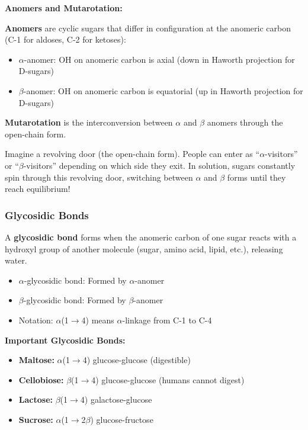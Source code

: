\textbf{Anomers and Mutarotation:}
\begin{definition}
\textbf{Anomers} are cyclic sugars that differ in configuration at the anomeric carbon (C-1 for aldoses, C-2 for ketoses):
\begin{itemize}
    \item $\alpha$-anomer: OH on anomeric carbon is axial (down in Haworth projection for D-sugars)
    \item $\beta$-anomer: OH on anomeric carbon is equatorial (up in Haworth projection for D-sugars)
\end{itemize}

\textbf{Mutarotation} is the interconversion between $\alpha$ and $\beta$ anomers through the open-chain form.
\end{definition}

\begin{analogy}
Imagine a revolving door (the open-chain form). People can enter as ``$\alpha$-visitors'' or ``$\beta$-visitors'' depending on which side they exit. In solution, sugars constantly spin through this revolving door, switching between $\alpha$ and $\beta$ forms until they reach equilibrium!
\end{analogy}

\subsubsection{Glycosidic Bonds}

\begin{definition}
A \textbf{glycosidic bond} forms when the anomeric carbon of one sugar reacts with a hydroxyl group of another molecule (sugar, amino acid, lipid, etc.), releasing water.
\end{definition}

\begin{itemize}
    \item $\alpha$-glycosidic bond: Formed by $\alpha$-anomer
    \item $\beta$-glycosidic bond: Formed by $\beta$-anomer
    \item Notation: $\alpha$(1$\rightarrow$4) means $\alpha$-linkage from C-1 to C-4
\end{itemize}

\begin{example}
\textbf{Important Glycosidic Bonds:}
\begin{itemize}
    \item \textbf{Maltose:} $\alpha$(1$\rightarrow$4) glucose-glucose (digestible)
    \item \textbf{Cellobiose:} $\beta$(1$\rightarrow$4) glucose-glucose (humans cannot digest)
    \item \textbf{Lactose:} $\beta$(1$\rightarrow$4) galactose-glucose
    \item \textbf{Sucrose:} $\alpha$(1$\rightarrow$2$\beta$) glucose-fructose
\end{itemize}
\end{example}

